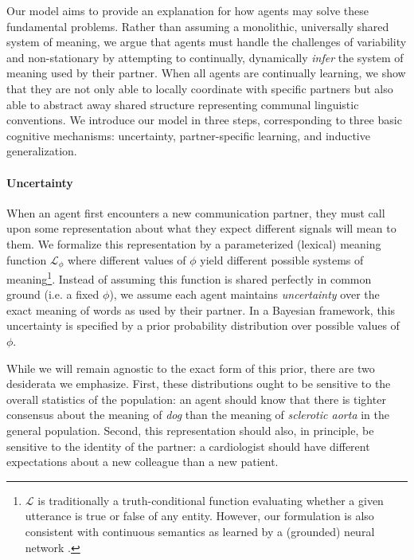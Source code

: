 Our model aims to provide an explanation for how agents may solve these fundamental problems.
Rather than assuming a monolithic, universally shared system of meaning, we argue that agents must handle the challenges of variability and non-stationary by attempting to continually, dynamically \emph{infer} the system of meaning used by their partner.
When all agents are continually learning, we show that they are not only able to locally coordinate with specific partners but also able to abstract away shared structure representing communal linguistic conventions.
We introduce our model in three steps, corresponding to three basic cognitive mechanisms: uncertainty, partner-specific learning, and inductive generalization.

\paragraph{Uncertainty} 

When an agent first encounters a new communication partner, they must call upon some representation about what they expect different signals will mean to them. 
We formalize this representation by a parameterized (lexical) meaning function $\mathcal{L}_{\phi}$ where different values of $\phi$ yield different possible systems of meaning\footnote{$\mathcal{L}$ is traditionally a truth-conditional function evaluating whether a given utterance is true or false of any entity. However, our formulation is also consistent with continuous semantics \cite{degen2020redundancy} as learned by a (grounded) neural network \cite{potts2019case}.}.
Instead of assuming this function is shared perfectly in common ground (i.e. a fixed $\phi$), we assume each agent maintains \emph{uncertainty} over the exact meaning of words as used by their partner.
In a Bayesian framework, this uncertainty is specified by a prior probability distribution over possible values of $\phi$.

While we will remain agnostic to the exact form of this prior, there are two desiderata we emphasize.
First, these distributions ought to be sensitive to the overall statistics of the population: an agent should know that there is tighter consensus about the meaning of \emph{dog} than the meaning of \emph{sclerotic aorta} in the general population. 
Second, this representation should also, in principle, be sensitive to the identity of the partner: a cardiologist should have different expectations about a new colleague than a new patient.

